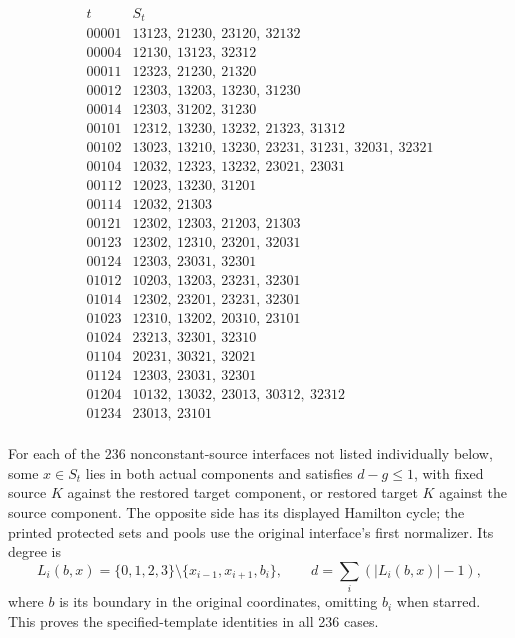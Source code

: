\documentclass[11pt]{article}
\numberwithin{equation}{section}
\numberwithin{table}{section}
\begin{document}
\[\begin{array}{c|l}t&S_t\\\hline
00001&13123,\ 21230,\ 23120,\ 32132\\
00004&12130,\ 13123,\ 32312\\
00011&12323,\ 21230,\ 21320\\
00012&12303,\ 13203,\ 13230,\ 31230\\
00014&12303,\ 31202,\ 31230\\
00101&12312,\ 13230,\ 13232,\ 21323,\ 31312\\
00102&13023,\ 13210,\ 13230,\ 23231,\ 31231,\ 32031,\ 32321\\
00104&12032,\ 12323,\ 13232,\ 23021,\ 23031\\
00112&12023,\ 13230,\ 31201\\
00114&12032,\ 21303\\
00121&12302,\ 12303,\ 21203,\ 21303\\
00123&12302,\ 12310,\ 23201,\ 32031\\
00124&12303,\ 23031,\ 32301\\
01012&10203,\ 13203,\ 23231,\ 32301\\
01014&12302,\ 23201,\ 23231,\ 32301\\
01023&12310,\ 13202,\ 20310,\ 23101\\
01024&23213,\ 32301,\ 32310\\
01104&20231,\ 30321,\ 32021\\
01124&12303,\ 23031,\ 32301\\
01204&10132,\ 13032,\ 23013,\ 30312,\ 32312\\
01234&23013,\ 23101\\
\end{array}\]


For each of the 236 nonconstant-source interfaces not listed individually
below, some $x\in S_t$ lies in both actual components and satisfies
$d-g\le1$, with fixed source $K$ against the restored target component,
or restored target $K$ against the source component. The opposite side
has its displayed Hamilton cycle; the printed protected sets and pools
use the original interface's first normalizer. Its degree is
\[
L_i(b,x)=\{0,1,2,3\}\setminus\{x_{i-1},x_{i+1},b_i\},\qquad
d=\sum_i(|L_i(b,x)|-1),
\]
where $b$ is its boundary in the original coordinates, omitting $b_i$
when starred. This proves the specified-template identities in all 236 cases.
\end{document}

